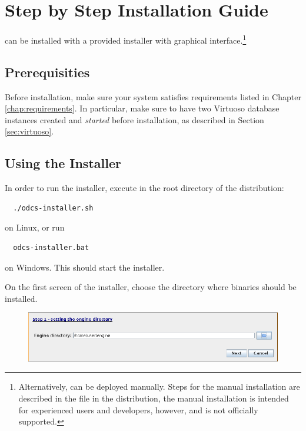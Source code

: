 \chapter{Step by Step Installation Guide}
\odcs can be installed with a provided installer with graphical interface.\footnote{Alternatively, \odcs can be deployed manually. Steps for the manual installation are described in the  file in the distribution, the manual installation is intended for experienced users and developers, however, and is not officially supported.}

\section{Prerequisities}
Before installation, make sure your system satisfies requirements listed in Chapter \ref{chap:requirements}. In particular, make sure to have two Virtuoso database instances created and \textit{started} before installation, as described in Section \ref{sec:virtuoso}.

\section{Using the Installer}
In order to run the installer, execute in the root directory of the distribution:
\begin{verbatim}
  ./odcs-installer.sh
\end{verbatim}
on Linux, or run
\begin{verbatim}
  odcs-installer.bat
\end{verbatim}
on Windows. This should start the installer.

On the first screen of the installer, choose the directory where \odcs binaries should be installed.

\begin{figure}[!h]
    \centering
    \includegraphics[width=\textwidth]{images/install-step-01.png}
\end{figure}

\FloatBarrier

